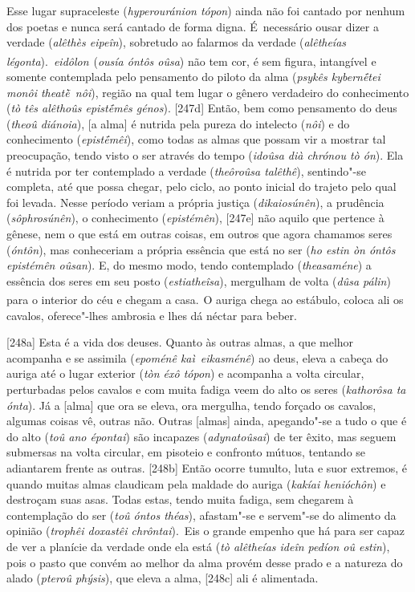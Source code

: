 Esse lugar supraceleste (\emph{hyperouránion tópon}) ainda não foi
cantado por nenhum dos poetas e nunca será cantado de forma digna. É~necessário ousar dizer a verdade (\emph{alêthès eipeîn}), sobretudo ao
falarmos da verdade (\emph{alêtheías
légonta}).~\emph{eidôlon}\textsuperscript{~}(\emph{ousía óntôs oûsa})
não tem cor, é sem figura, intangível e somente contemplada pelo
pensamento do piloto da alma (\emph{psykês kybernḗtei monôi
theatḕ~nôi}), região na qual tem lugar o gênero verdadeiro do
conhecimento (\emph{tò tês alêthoûs epistḗmês génos}). [247d] Então,
bem como pensamento do deus (\emph{theoû diánoia}), [a alma] é
nutrida pela pureza do intelecto (\emph{nôi}) e do conhecimento
(\emph{epistḗmêi}), como todas as almas que possam vir a mostrar tal
preocupação, tendo visto o ser através do tempo (\emph{idoûsa dià
chrónou tò ón}). Ela é nutrida por ter contemplado a verdade
(\emph{theôroûsa talêthê}), sentindo"-se completa, até que possa chegar,
pelo ciclo, ao ponto inicial do trajeto pelo qual foi levada. Nesse
período veriam a própria justiça (\emph{dikaiosúnên}), a prudência
(\emph{sôphrosúnên}), o conhecimento (\emph{epistémên}), [247e] não
aquilo que pertence à gênese, nem o que está em outras coisas, em outros
que agora chamamos seres (\emph{óntôn}), mas conheceriam a própria
essência que está no ser (\emph{ho estin òn óntôs epistémên oûsan}). E,
do mesmo modo, tendo contemplado (\emph{theasaméne}) a essência dos
seres em seu posto (\emph{estiatheîsa}), mergulham de volta (\emph{dûsa
pálin}) para o interior do céu e chegam a casa.\textsuperscript{~}O
auriga chega ao estábulo, coloca ali os cavalos, oferece"-lhes ambrosia e
lhes dá néctar para beber.

[248a] Esta é a vida dos deuses. Quanto às outras almas, a que
melhor acompanha e se assimila (\emph{epoménê kaì}~\emph{eikasménê}) ao
deus, eleva a cabeça do auriga até o lugar exterior (\emph{tòn éxô
tópon}) e acompanha a volta circular, perturbadas pelos cavalos e com
muita fadiga veem do alto os seres (\emph{kathorôsa ta ónta}). Já a
[alma] que ora se eleva, ora mergulha, tendo forçado os cavalos,
algumas coisas vê, outras não. Outras [almas] ainda, apegando"-se a
tudo o que é do alto (\emph{toû ano épontai}) são incapazes
(\emph{adynatoûsai}) de ter êxito, mas seguem submersas na volta
circular, em pisoteio e confronto mútuos, tentando se adiantarem frente
as outras. [248b] Então ocorre tumulto, luta e suor extremos, é
quando muitas almas claudicam pela maldade do auriga (\emph{kakíai
henióchôn}) e destroçam suas asas. Todas estas, tendo muita fadiga, sem
chegarem à contemplação do ser (\emph{toû óntos théas}), afastam"-se e
servem"-se do alimento da opinião (\emph{trophêi doxastêi chrôntai}).~Eis
o grande empenho que há para ser capaz de ver a planície da verdade onde
ela está (\emph{tò alêtheías ideîn pedíon oû estin}), pois o pasto que
convém ao melhor da alma provém desse prado e a natureza do alado
(\emph{pteroû phýsis}), que eleva a alma, [248c] ali é alimentada.

